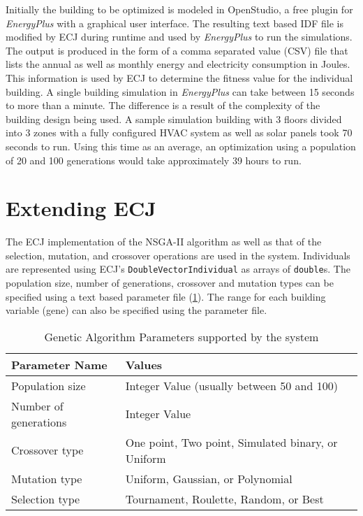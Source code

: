 Initially the building to be optimized is modeled in OpenStudio, a free plugin for \textit{EnergyPlus} with a graphical user interface. The resulting text based IDF file is modified by ECJ during runtime and used by \textit{EnergyPlus} to run the simulations. The output is produced in the form of a comma separated value (CSV) file that lists the annual as well as monthly energy and electricity consumption in Joules. This information is used by ECJ to determine the fitness value for the individual building. A single building simulation in \textit{EnergyPlus} can take between 15 seconds to more than a minute. The difference is a result of the complexity of the building design being used. A sample simulation building with  3 floors divided into 3 zones with a fully configured HVAC system as well as solar panels took 70 seconds to run. Using this time as an average, an optimization using a population of 20 and 100 generations would take approximately 39 hours to run.

\section{Extending ECJ}

The ECJ implementation of the NSGA-II algorithm as well as that of the selection, mutation, and crossover operations are used in the system. Individuals are represented using ECJ's \texttt{DoubleVectorIndividual} as arrays of \texttt{double}s. The population size, number of generations, crossover and mutation types can be specified using a text based parameter file (\ref{table:params}). The range for each building variable (gene) can also be specified using the parameter file. 

\begin{table}[htbp]
    \centering
    \begin{tabular}{|l|l|}
    \hline
    Parameter Name                 & Values  \\ \hline
    Population size                & Integer Value (usually between 50 and 100) \\
    Number of generations          & Integer Value \\
    Crossover type                 & One point, Two point, Simulated binary, or Uniform \\ 
    Mutation type                  & Uniform, Gaussian, or Polynomial \\
    Selection type                 & Tournament, Roulette, Random, or Best \\ \hline
    \end{tabular}
    \caption{Genetic Algorithm Parameters supported by the system}
    \label{table:params}
\end{table}

